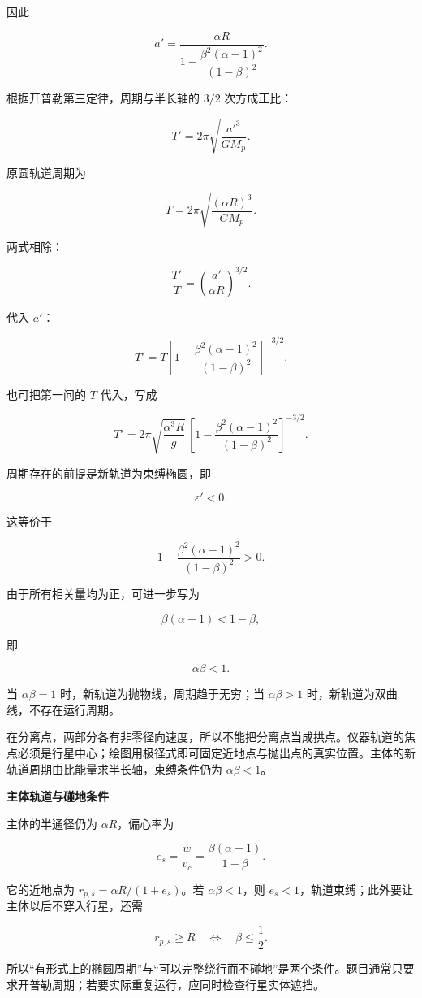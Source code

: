 \documentclass[12pt,a4paper,UTF8]{ctexart}
\begin{document}
因此

\[a'=
\frac{\alpha R}{
1-\dfrac{\beta^2(\alpha-1)^2}{(1-\beta)^2}
}.\]

根据开普勒第三定律，周期与半长轴的 \(3/2\) 次方成正比：

\[T'=2\pi\sqrt{\frac{a'^3}{GM_{\!p}}}.\]

原圆轨道周期为

\[T=2\pi\sqrt{\frac{(\alpha R)^3}{GM_{\!p}}}.\]

两式相除：

\[\frac{T'}{T}
=\left(\frac{a'}{\alpha R}\right)^{3/2}.\]

代入 \(a'\)：

\[\boxed{
T'
=T\left[
1-\frac{\beta^2(\alpha-1)^2}{(1-\beta)^2}
\right]^{-3/2}
}.\]

也可把第一问的 \(T\) 代入，写成

\[\boxed{
T'
=2\pi\sqrt{\frac{\alpha^3R}{g}}\,
\left[
1-\frac{\beta^2(\alpha-1)^2}{(1-\beta)^2}
\right]^{-3/2}
}.\]

周期存在的前提是新轨道为束缚椭圆，即

\[\varepsilon'<0.\]

这等价于

\[1-\frac{\beta^2(\alpha-1)^2}{(1-\beta)^2}>0.\]

由于所有相关量均为正，可进一步写为

\[\beta(\alpha-1)<1-\beta,\]

即

\[\boxed{\alpha\beta<1}.\]

当 \(\alpha\beta=1\) 时，新轨道为抛物线，周期趋于无穷；当
\(\alpha\beta>1\) 时，新轨道为双曲线，不存在运行周期。

在分离点，两部分各有非零径向速度，所以不能把分离点当成拱点。仪器轨道的焦点必须是行星中心；绘图用极径式即可固定近地点与抛出点的真实位置。主体的新轨道周期由比能量求半长轴，束缚条件仍为
\(\alpha\beta<1\)。

\textbf{主体轨道与碰地条件}

主体的半通径仍为 \(\alpha R\)，偏心率为

\[e_s=\frac{w}{v_c}=\frac{\beta(\alpha-1)}{1-\beta}.\]

它的近地点为 \(r_{p,s}=\alpha R/(1+e_s)\)。若 \(\alpha\beta<1\)，则
\(e_s<1\)，轨道束缚；此外要让主体以后不穿入行星，还需

\[r_{p,s}\ge R\quad\Longleftrightarrow\quad\beta\le\frac12.\]

所以``有形式上的椭圆周期''与``可以完整绕行而不碰地''是两个条件。题目通常只要求开普勒周期；若要实际重复运行，应同时检查行星实体遮挡。
\end{document}
